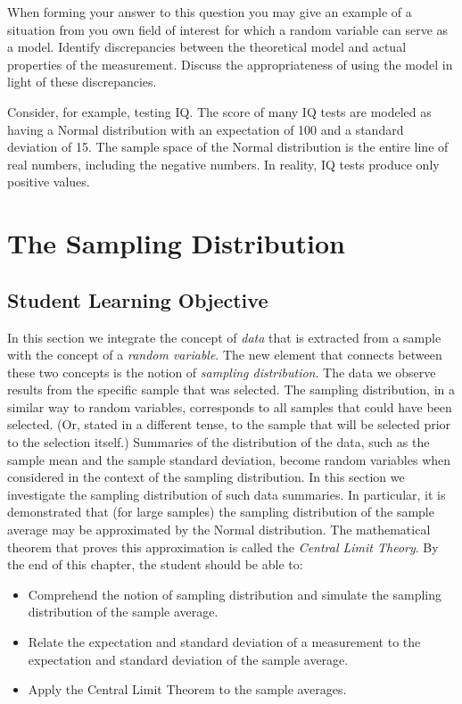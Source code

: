 \documentclass[
]{krantz}
\theoremstyle{definition}
\theoremstyle{definition}
\theoremstyle{definition}
\theoremstyle{remark}
\begin{document}
When forming your answer to this question you may give an example of a
situation from you own field of interest for which a random variable can
serve as a model. Identify discrepancies between the theoretical model
and actual properties of the measurement. Discuss the appropriateness of
using the model in light of these discrepancies.

Consider, for example, testing IQ. The score of many IQ tests are
modeled as having a Normal distribution with an expectation of 100 and a
standard deviation of 15. The sample space of the Normal distribution is
the entire line of real numbers, including the negative numbers. In
reality, IQ tests produce only positive values.

\hypertarget{ChapSampDist}{%
\chapter{The Sampling Distribution}\label{ChapSampDist}}

\hypertarget{student-learning-objective-3}{%
\section{Student Learning Objective}\label{student-learning-objective-3}}

In this section we integrate the concept of \emph{data} that is extracted
from a sample with the concept of a \emph{random variable}. The new element
that connects between these two concepts is the notion of \emph{sampling
distribution}. The data we observe results from the specific sample that
was selected. The sampling distribution, in a similar way to random
variables, corresponds to all samples that could have been selected.
(Or, stated in a different tense, to the sample that will be selected
prior to the selection itself.) Summaries of the distribution of the
data, such as the sample mean and the sample standard deviation, become
random variables when considered in the context of the sampling
distribution. In this section we investigate the sampling distribution
of such data summaries. In particular, it is demonstrated that (for
large samples) the sampling distribution of the sample average may be
approximated by the Normal distribution. The mathematical theorem that
proves this approximation is called the \emph{Central Limit Theory}. By the
end of this chapter, the student should be able to:

\begin{itemize}
\item
  Comprehend the notion of sampling distribution and simulate the
  sampling distribution of the sample average.
\item
  Relate the expectation and standard deviation of a measurement to
  the expectation and standard deviation of the sample average.
\item
  Apply the Central Limit Theorem to the sample averages.
\end{itemize}
\end{document}
